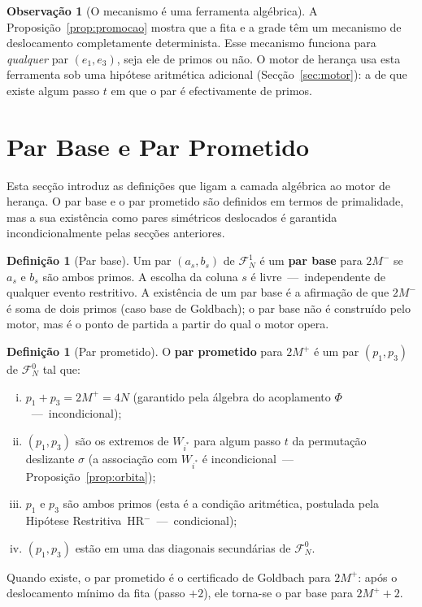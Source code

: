 \documentclass[12pt, a4paper]{article}
\theoremstyle{plain}
\theoremstyle{definition}
\newtheorem{definition}[theorem]{Definição}
\newtheorem{remark}[theorem]{Observação}
\theoremstyle{remark}
\begin{document}
	\begin{remark}[O mecanismo é uma ferramenta algébrica]
		A Proposição~\ref{prop:promocao} mostra que a fita e a grade
		têm um mecanismo de deslocamento completamente determinista.
		Esse mecanismo funciona para \emph{qualquer} par $(e_1,e_3)$,
		seja ele de primos ou não.  O motor de herança usa esta ferramenta
		sob uma hipótese aritmética adicional (Secção~\ref{sec:motor}):
		a de que existe algum passo $t$ em que o par é efectivamente de
		primos.
	\end{remark}
	
	\section{Par Base e Par Prometido}
	\label{sec:pares}
	
	Esta secção introduz as definições que ligam a camada algébrica ao
	motor de herança.  O par base e o par prometido são definidos em
	termos de primalidade, mas a sua existência como pares simétricos
	deslocados é garantida incondicionalmente pelas secções anteriores.
	
	\begin{definition}[Par base]
		\label{def:base}
		Um par $(a_s,b_s)$ de $\mathcal{F}_N^1$ é um \textbf{par base}
		para $2M^-$ se $a_s$ e $b_s$ são ambos primos.  A escolha da
		coluna $s$ é livre~---~independente de qualquer evento restritivo.
		A existência de um par base é a afirmação de que $2M^-$ é soma
		de dois primos (caso base de Goldbach); o par base não é
		construído pelo motor, mas é o ponto de partida a partir do qual
		o motor opera.
	\end{definition}
	
	\begin{definition}[Par prometido]
		\label{def:prometido}
		O \textbf{par prometido} para $2M^+$ é um par $(p_1,p_3)$ de
		$\mathcal{F}_N^0$ tal que:
		\begin{enumerate}[(i)]
			\item $p_1+p_3=2M^+=4N$
			(garantido pela álgebra do acoplamento $\Phi$~---~incondicional);
			\item $(p_1,p_3)$ são os extremos de $W_{i^*}$ para algum
			passo $t$ da permutação deslizante $\sigma$
			(a associação com $W_{i^*}$ é incondicional~---~
			Proposição~\ref{prop:orbita});
			\item $p_1$ e $p_3$ são ambos primos
			(esta é a condição aritmética, postulada pela Hipótese
			Restritiva~HR$^-$~---~condicional);
			\item $(p_1,p_3)$ estão em uma das diagonais secundárias de $\mathcal{F}_N^0$.
		\end{enumerate}
		Quando existe, o par prometido é o certificado de Goldbach para
		$2M^+$: após o deslocamento mínimo da fita (passo $+2$), ele
		torna-se o par base para $2M^++2$.
	\end{definition}
	
\end{document}
